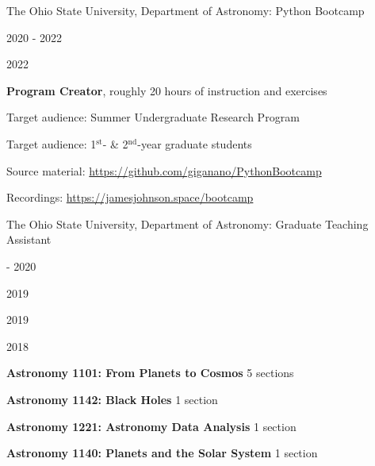 \documentclass[cv.tex]{subfiles}
\begin{document}
{\color{themecolor} \large The Ohio State University, Department of Astronomy:
Python Bootcamp}
\par\noindent
\parbox{0.18\textwidth}{%
	\vspace{2mm}
	\raggedleft
	\null \par
	2020 - 2022 \par
	2022 \par
	\null \par
	\null
}
\hspace{1mm}
\parbox{0.73\textwidth}{%
	\textbf{Program Creator}, roughly 20 hours of instruction and exercises \par
	Target audience: Summer Undergraduate Research Program \par
	Target audience: 1$^\text{st}$- \& 2$^\text{nd}$-year graduate students \par
	Source material: 
	{\small \url{https://github.com/giganano/PythonBootcamp}} \par
	Recordings: {\small \url{https://jamesjohnson.space/bootcamp}}
}

\par\null\par\null\par\noindent
{\color{themecolor} \large The Ohio State University, Department of Astronomy:
Graduate Teaching Assistant}
\par\noindent
\parbox{0.18\textwidth}{%
	 - 2020 \par
	2019 \par
	2019 \par
	2018
}
\hspace{1mm}
\parbox{0.8\textwidth}{%
	\vspace{1mm}
	\textbf{Astronomy 1101: From Planets to Cosmos} \hfill 5 sections \par
	\textbf{Astronomy 1142: Black Holes} \hfill 1 section \par
	\textbf{Astronomy 1221: Astronomy Data Analysis} \hfill 1 section \par
	\textbf{Astronomy 1140: Planets and the Solar System} \hfill 1 section
}
\end{document}
